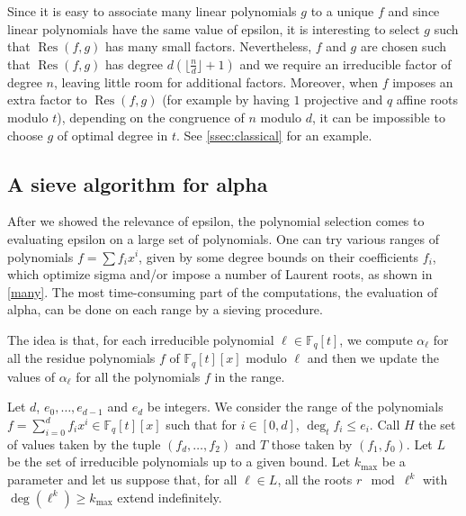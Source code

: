 \documentclass[a4wide]{article}
\newcommand{\F}{{\mathbb F}}
\DeclareMathOperator{\Res}{Res}
\theoremstyle{plain}
\theoremstyle{definition}
\theoremstyle{remark}
\begin{document}
Since it is easy to associate many linear polynomials $g$ to a unique $f$ and
since linear polynomials have the same value of epsilon, it is interesting
to select $g$ such that $\Res(f,g)$ has many small factors. Nevertheless,
$f$ and $g$ are chosen such that $\Res(f,g)$ has degree $d
(\lfloor \frac{n}{d}\rfloor+1)$ and we require an irreducible factor of
degree $n$, leaving little room for additional factors. Moreover, when
$f$ imposes an extra factor to $\Res(f,g)$ (for example by having
$1$ projective and $q$ affine roots modulo $t$), depending on the
congruence of $n$ modulo $d$, it can be impossible to choose $g$ of optimal
degree in $t$. See \ref{ssec:classical} for an example.
\subsection{A sieve algorithm for alpha}
After we showed the relevance of epsilon, the polynomial selection comes to
evaluating epsilon on a large set of polynomials. One can try various ranges
of polynomials $f=\sum f_i x^i$, given by some degree bounds on their
coefficients $f_i$, which optimize sigma and/or impose a number of Laurent
roots, as shown in \ref{many}. The most time-consuming part of the
computations, the evaluation of alpha, can be done on each range by a
sieving procedure.  

The idea is that, for each
 irreducible polynomial $\ell\in\F_q[t]$, we compute $\alpha_\ell$ for all the
 residue polynomials $f$ of $\F_q[t][x]$ modulo $\ell$ and then we
 update the values of $\alpha_\ell$ for all the polynomials $f$ in the
 range. 

 Let $d$, $e_0,\ldots,e_{d-1}$ and $e_d$ be integers. We consider the range
 of the polynomials $f=\sum_{i=0}^d f_i x^i\in\F_q[t][x]$ such that for
 $i\in[0,d]$, $\deg_t f_i\leq e_i$. Call $H$ the set of values taken by the
 tuple $(f_d,\ldots,f_2)$ and $T$ those taken by $(f_1,f_0)$. Let $L$ be the
 set of irreducible polynomials up to a given bound. Let $k_\text{max}$ be a
 parameter and let us suppose
that, for all $\ell\in L$, all the roots $r\mod \ell^k$ with
$\deg(\ell^k)\geq k_\text{max}$ extend indefinitely.
\end{document}
